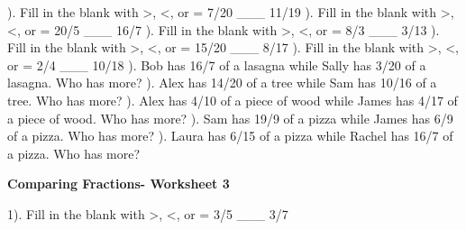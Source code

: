 \documentclass{article}%
\begin{document}
). Fill in the blank with >, <, or = 7/20 \_\_\_ 11/19%
\newline%
\newline%
). Fill in the blank with >, <, or = 20/5 \_\_\_ 16/7%
\newline%
\newline%
). Fill in the blank with >, <, or = 8/3 \_\_\_ 3/13%
\newline%
\newline%
). Fill in the blank with >, <, or = 15/20 \_\_\_ 8/17%
\newline%
\newline%
). Fill in the blank with >, <, or = 2/4 \_\_\_ 10/18%
\newline%
\newline%
). Bob has 16/7 of a lasagna while Sally has 3/20 of a lasagna. Who has more?%
\newline%
\newline%
). Alex has 14/20 of a tree while Sam has 10/16 of a tree. Who has more?%
\newline%
\newline%
). Alex has 4/10 of a piece of wood while James has 4/17 of a piece of wood. Who has more?%
\newline%
\newline%
). Sam has 19/9 of a pizza while James has 6/9 of a pizza. Who has more?%
\newline%
\newline%
). Laura has 6/15 of a pizza while Rachel has 16/7 of a pizza. Who has more?%
\newline%
\newline%
\newline%
\pagebreak%
\large%
\begin{center}%
\textbf{Comparing Fractions- Worksheet 3}%
\newline%
\newline%
\newline%
\end{center} \normalsize%
1). Fill in the blank with >, <, or = 3/5 \_\_\_ 3/7%
\end{document}
